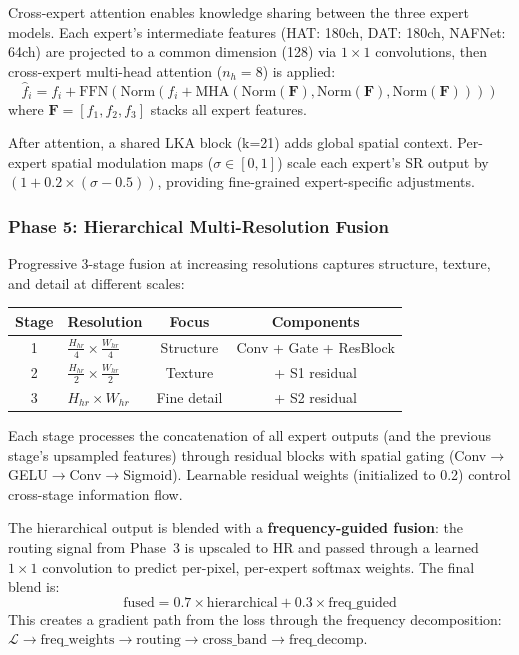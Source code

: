 \documentclass[10pt,twocolumn,letterpaper]{article}
\begin{document}
Cross-expert attention enables knowledge sharing between the three expert models. Each expert's intermediate features (HAT: 180ch, DAT: 180ch, NAFNet: 64ch) are projected to a common dimension (128) via $1\times 1$ convolutions, then cross-expert multi-head attention ($n_h=8$) is applied:
\begin{equation}
\hat{f}_i = f_i + \text{FFN}\!\left(\text{Norm}\!\left(f_i + \text{MHA}(\text{Norm}(\mathbf{F}), \text{Norm}(\mathbf{F}), \text{Norm}(\mathbf{F}))\right)\right)
\end{equation}
where $\mathbf{F} = [f_1, f_2, f_3]$ stacks all expert features.

After attention, a shared LKA block (k=21) adds global spatial context. Per-expert spatial modulation maps ($\sigma \in [0,1]$) scale each expert's SR output by $(1 + 0.2 \times (\sigma - 0.5))$, providing fine-grained expert-specific adjustments.

\subsubsection{Phase 5: Hierarchical Multi-Resolution Fusion}

Progressive 3-stage fusion at increasing resolutions captures structure, texture, and detail at different scales:

\begin{table}[h]
\centering
\small
\begin{tabular}{@{}clcc@{}}
\toprule
\textbf{Stage} & \textbf{Resolution} & \textbf{Focus} & \textbf{Components} \\
\midrule
1 & $\frac{H_{hr}}{4} \times \frac{W_{hr}}{4}$ & Structure & Conv + Gate + ResBlock \\
2 & $\frac{H_{hr}}{2} \times \frac{W_{hr}}{2}$ & Texture & + S1 residual \\
3 & $H_{hr} \times W_{hr}$ & Fine detail & + S2 residual \\
\bottomrule
\end{tabular}
\end{table}

Each stage processes the concatenation of all expert outputs (and the previous stage's upsampled features) through residual blocks with spatial gating (Conv$\to$GELU$\to$Conv$\to$Sigmoid). Learnable residual weights (initialized to 0.2) control cross-stage information flow.

The hierarchical output is blended with a \textbf{frequency-guided fusion}: the routing signal from Phase~3 is upscaled to HR and passed through a learned $1\times 1$ convolution to predict per-pixel, per-expert softmax weights. The final blend is:
\begin{equation}
\text{fused} = 0.7 \times \text{hierarchical} + 0.3 \times \text{freq\_guided}
\end{equation}
This creates a gradient path from the loss through the frequency decomposition: $\mathcal{L} \to \text{freq\_weights} \to \text{routing} \to \text{cross\_band} \to \text{freq\_decomp}$.
\end{document}
